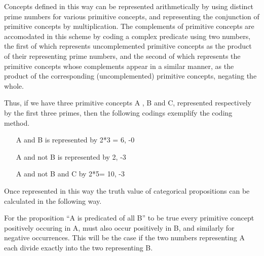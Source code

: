 Concepts defined in this way can be represented arithmetically by using distinct prime numbers for
various primitive concepts, and representing the conjunction of primitive concepts by multiplication.
The complements of primitive concepts are accomodated in this scheme by coding a complex predicate
using two numbers, the first of which represents uncomplemented primitive concepts as the product of
their representing prime numbers, and the second of which represents the primitive concepts whose
complements appear in a similar manner, as the product of the corresponding (uncomplemented) primitive
concepts, negating the whole.

Thus, if we have three primitive concepts A , B and C, represented respectively by
the first three primes, then the following codings exemplify  the coding method.

\begin{itemize}
\item[A and B] is represented by 2*3 = 6, -0
\item[A and not B] is represented by 2, -3
\item[A and not B and C] by 2*5= 10, -3
\end{itemize}

Once represented in this way the truth value of categorical
propositions can be calculated in the following way.

For the proposition ``A is predicated of all B'' to be true every primitive concept
positively occuring in A, must also occur positively in B, and similarly for negative
occurrences.
This will be the case if the two numbers representing A each divide exactly into the two
representing B.


